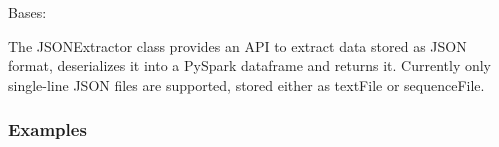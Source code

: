 \documentclass[a4paper,10pt, twoside,english]{sphinxmanual}
\begin{document}
\begin{fulllineitems}
\label{\detokenize{extractor/json:spooq2.extractor.json_files.JSONExtractor}}
Bases: {\hyperref[\detokenize{base_classes/extractor:spooq2.extractor.extractor.Extractor}]{}}

The JSONExtractor class provides an API to extract data stored as JSON format,
deserializes it into a PySpark dataframe and returns it. Currently only
single-line JSON files are supported, stored either as textFile or sequenceFile.
\subsubsection*{Examples}

\begin{sphinxVerbatim}[commandchars=\\\{\}]
     
\end{sphinxVerbatim}

\begin{sphinxVerbatim}[commandchars=\\\{\}]
  
    
\end{sphinxVerbatim}


\end{fulllineitems}
\end{document}
